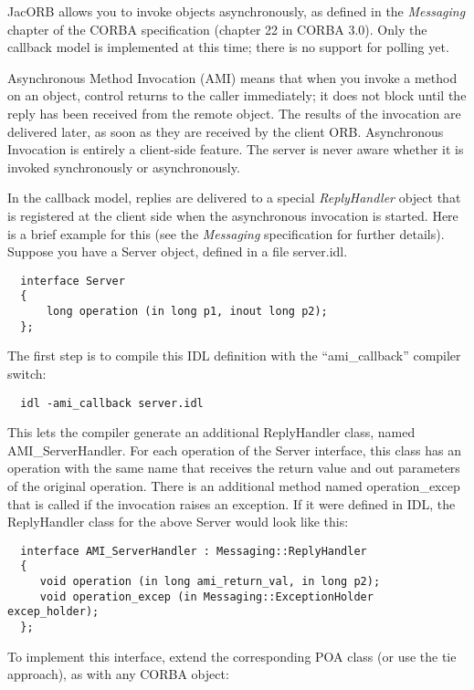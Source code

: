 

JacORB allows you to invoke objects asynchronously, as defined in the
\emph{Messaging} chapter of the CORBA specification (chapter 22 in
CORBA 3.0).  Only the callback model is implemented at this time;
there is no support for polling yet.

Asynchronous Method Invocation (AMI) means that when you invoke a
method on an object, control returns to the caller immediately; it
does not block until the reply has been received from the remote
object.  The results of the invocation are delivered later, as soon as
they are received by the client ORB.  Asynchronous Invocation is
entirely a client-side feature.  The server is never aware whether it
is invoked synchronously or asynchronously.

In the callback model, replies are delivered to a special
\emph{ReplyHandler} object that is registered at the client side when
the asynchronous invocation is started.  Here is a brief example for
this (see the \emph{Messaging} specification for further details).
Suppose you have a Server object, defined in a file server.idl.

\begin{verbatim}  interface Server
  {
      long operation (in long p1, inout long p2);
  };
\end{verbatim}

The first step is to compile this IDL definition with the
``ami\_callback'' compiler switch:

\begin{verbatim}  idl -ami_callback server.idl\end{verbatim}

This lets the compiler generate an additional ReplyHandler class,
named AMI\_ServerHandler.  For each operation of the Server interface,
this class has an operation with the same name that receives the
return value and out parameters of the original operation.  There is
an additional method named operation\_excep that is called if the
invocation raises an exception.  If it were defined in IDL, the
ReplyHandler class for the above Server would look like this:

\begin{verbatim}  interface AMI_ServerHandler : Messaging::ReplyHandler
  {
     void operation (in long ami_return_val, in long p2);
     void operation_excep (in Messaging::ExceptionHolder excep_holder);
  };
\end{verbatim}

To implement this interface, extend the corresponding POA class (or
use the tie approach), as with any CORBA object:

